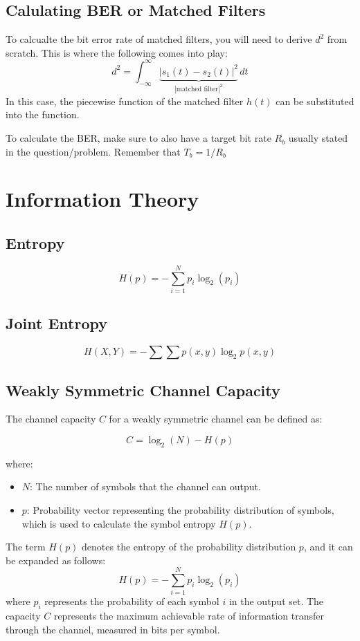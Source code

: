 \documentclass[10pt]{article}
\begin{document}
\subsection{Calulating BER or Matched Filters}
To calcualte the bit error rate of matched filters, you will need to derive $d^2$ from scratch. This is where the following comes into play:
\[
    d^2 = \int_{-\infty}^{\infty} \underbrace{\left|s_1(t) - s_2(t)\right| ^2}_{|\text{matched filter}|^2}\,dt
\]
In this case, the piecewise function of the matched filter $h(t)$ can be substituted into the function. 

To calculate the BER, make sure to also have a target bit rate $R_b$ usually stated in the question/problem. Remember that $T_b = 1/R_b$

\section{Information Theory}
\subsection{Entropy}
\[
    H(p) = - \sum_{i=1}^{N} p_i \log_2(p_i)
\]

\subsection{Joint Entropy}
\[
	H(X,Y) = - \sum \sum p(x,y) \log_2 p(x,y)
\]

\subsection{Weakly Symmetric Channel Capacity}

The channel capacity \( C \) for a weakly symmetric channel can be defined as:

\[
    C = \log_2(N) - H(p)
\]

\noindent where:

\begin{itemize}
    \item \( N \): The number of symbols that the channel can output.
    \item \( p \): Probability vector representing the probability distribution of symbols, which is used to calculate the symbol entropy \( H(p) \).
\end{itemize}

The term \( H(p) \) denotes the entropy of the probability distribution \( p \), and it can be expanded as follows:
\[
    H(p) = - \sum_{i=1}^{N} p_i \log_2(p_i)
\]
where $p_i$ represents the probability of each symbol $i$ in the output set. The capacity $C$ represents the maximum achievable rate of information transfer through the channel, measured in bits per symbol.
\end{document}
